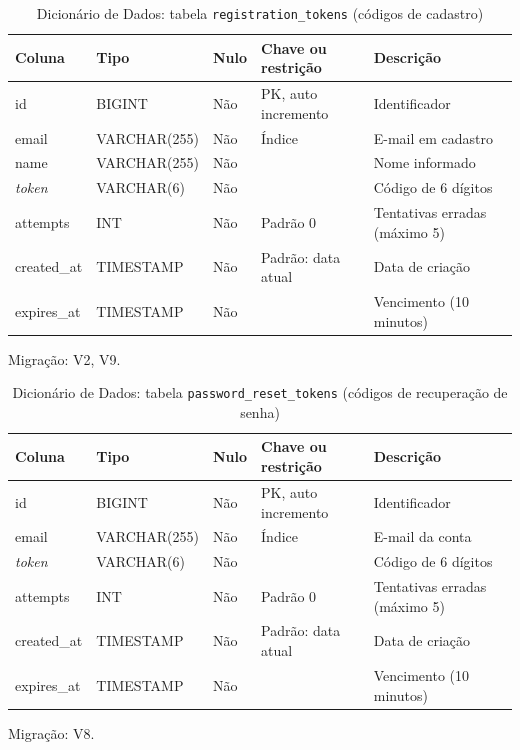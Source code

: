 \begin{table}[H]
\centering
\footnotesize
\caption{Dicionário de Dados: tabela \texttt{registration\_\allowbreak{}tokens} (códigos de cadastro)}
\label{tab:dd-registration-tokens}
\begin{tabular}{|>{\raggedright\arraybackslash}p{3.0cm}|>{\raggedright\arraybackslash}p{3.2cm}|>{\centering\arraybackslash}p{0.8cm}|>{\raggedright\arraybackslash}p{3.0cm}|>{\raggedright\arraybackslash}p{3.8cm}|}
\hline
\textbf{Coluna} & \textbf{Tipo} & \textbf{Nulo} & \textbf{Chave ou restrição} & \textbf{Descrição} \\
\hline
id & BIGINT & Não & PK, auto incremento & Identificador \\
\hline
email & VARCHAR(255) & Não & Índice & E-mail em cadastro \\
\hline
name & VARCHAR(255) & Não &  & Nome informado \\
\hline
\textit{token} & VARCHAR(6) & Não &  & Código de 6 dígitos \\
\hline
attempts & INT & Não & Padrão 0 & Tentativas erradas (máximo 5) \\
\hline
created\_\allowbreak{}at & TIMESTAMP & Não & Padrão: data atual & Data de criação \\
\hline
expires\_\allowbreak{}at & TIMESTAMP & Não &  & Vencimento (10 minutos) \\
\hline
\end{tabular}
\par\footnotesize Migração: V2, V9.
\end{table}

\begin{table}[H]
\centering
\footnotesize
\caption{Dicionário de Dados: tabela \texttt{password\_\allowbreak{}reset\_\allowbreak{}tokens} (códigos de recuperação de senha)}
\label{tab:dd-password-reset-tokens}
\begin{tabular}{|>{\raggedright\arraybackslash}p{3.0cm}|>{\raggedright\arraybackslash}p{3.2cm}|>{\centering\arraybackslash}p{0.8cm}|>{\raggedright\arraybackslash}p{3.0cm}|>{\raggedright\arraybackslash}p{3.8cm}|}
\hline
\textbf{Coluna} & \textbf{Tipo} & \textbf{Nulo} & \textbf{Chave ou restrição} & \textbf{Descrição} \\
\hline
id & BIGINT & Não & PK, auto incremento & Identificador \\
\hline
email & VARCHAR(255) & Não & Índice & E-mail da conta \\
\hline
\textit{token} & VARCHAR(6) & Não &  & Código de 6 dígitos \\
\hline
attempts & INT & Não & Padrão 0 & Tentativas erradas (máximo 5) \\
\hline
created\_\allowbreak{}at & TIMESTAMP & Não & Padrão: data atual & Data de criação \\
\hline
expires\_\allowbreak{}at & TIMESTAMP & Não &  & Vencimento (10 minutos) \\
\hline
\end{tabular}
\par\footnotesize Migração: V8.
\end{table}


